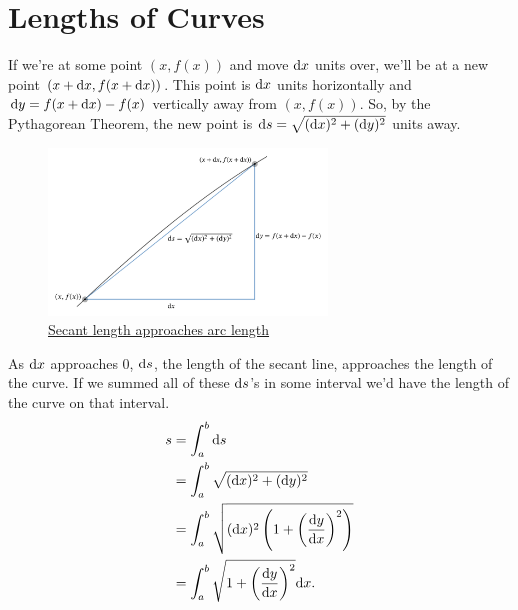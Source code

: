 \section{Lengths of Curves}
If we're at some point $(x,f(x))$ and move $\mathrm{d} x$ units over, we'll be at a new point $(x+\mathrm{d} x,f(x+\mathrm{d} x))$.
This point is $\mathrm{d} x$ units horizontally and $\mathrm{d} y=f(x+\mathrm{d} x)-f(x)$ vertically away from $(x,f(x))$.
So, by the Pythagorean Theorem, the new point is $\mathrm{d} s = \sqrt{(\mathrm{d} x)^2+(\mathrm{d} y)^2}$ units away.

\begin{figure}[H]
	\label{arclength}
	\centering
	\includegraphics[width=0.66\textwidth]{./applications_integrals/arclength.png}
	\caption{\hyperref{}{}{}{Secant length approaches arc length}}
\end{figure}

As $\mathrm{d} x$ approaches 0, $\mathrm{d} s$, the length of the secant line, approaches the length of the curve.
If we summed all of these $\mathrm{d} s$'s in some interval we'd have the length of the curve on that interval.
\begin{align*}
	s &= \int_{a}^{b}{\mathrm{d} s} \\
	&= \int_{a}^{b}{\sqrt{(\mathrm{d} x)^2+(\mathrm{d} y)^2}} \\
	&= \int_{a}^{b}{\sqrt{(\mathrm{d} x)^2\left(1+\left(\frac{\mathrm{d} y}{\mathrm{d} x}\right)^2\right)}} \\
	&= \int_{a}^{b}{\sqrt{1+\left(\frac{\mathrm{d} y}{\mathrm{d} x}\right)^2}\mathrm{d} x}.
\end{align*}


